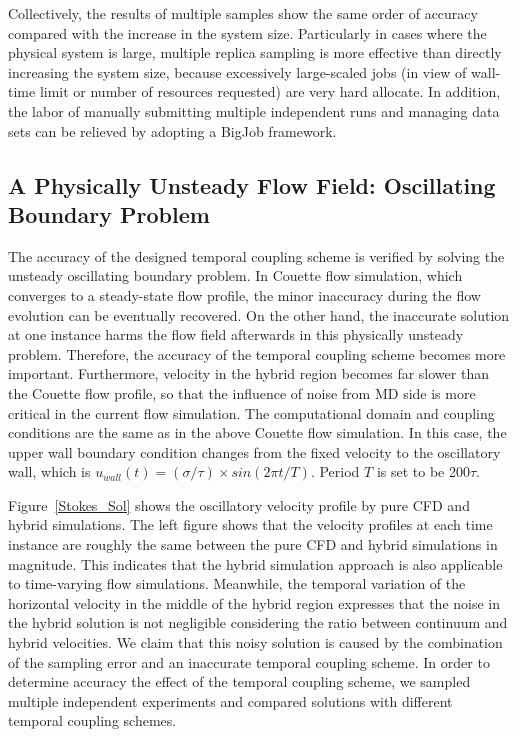 \documentclass[preprint,12pt]{elsarticle}
\begin{document}
Collectively, the results of multiple samples show the same order of accuracy compared with the increase in the system size. Particularly in cases where the physical system is large, multiple replica sampling is more effective than directly increasing the system size, because excessively large-scaled jobs (in view of wall-time limit or number of resources requested) are very hard allocate. In addition, the labor of manually submitting multiple independent runs and managing data sets can be relieved by adopting a BigJob framework.


\subsection{A Physically Unsteady Flow Field: Oscillating Boundary Problem}
\label{sec:accuracy_oscillation}

The accuracy of the designed temporal coupling scheme is verified by solving the unsteady oscillating boundary problem. In Couette flow simulation, which converges to a steady-state flow profile, the minor inaccuracy during the flow evolution can be eventually recovered. On the other hand, the inaccurate solution at one instance harms the flow field afterwards in this physically unsteady problem. Therefore, the accuracy of the temporal coupling scheme becomes more important. Furthermore, velocity in the hybrid region becomes far slower than the Couette flow profile, so that the influence of noise from MD side is more critical in the current flow simulation. The computational domain and coupling conditions are the same as in the above Couette flow simulation. In this case, the upper wall boundary condition changes from the fixed velocity to the oscillatory wall, which is $u_{wall}(t)=({\sigma}/{\tau}){\times}sin(2{\pi}t/T)$. Period $T$ is set to be 200$\tau$.


Figure~\ref{Stokes_Sol} shows the oscillatory velocity profile by pure CFD and hybrid simulations. The left figure shows that the velocity profiles at each time instance are roughly the same between the pure CFD and hybrid simulations in magnitude. This indicates that the hybrid simulation approach is also applicable to time-varying flow simulations. Meanwhile, the temporal variation of the horizontal velocity in the middle of the hybrid region expresses that the noise in the hybrid solution is not negligible considering the ratio between continuum and hybrid velocities. We claim that this noisy solution is caused by the combination of the sampling error and an inaccurate temporal coupling scheme. In order to determine accuracy the effect of the temporal coupling scheme, we sampled multiple independent experiments and compared solutions with different temporal coupling schemes.
\end{document}
